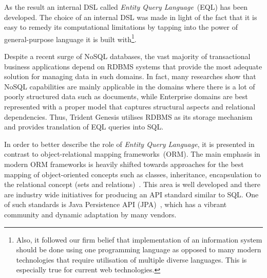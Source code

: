   As the result an internal DSL called \emph{Entity Query Language}~(EQL) has been developed.
  The choice of an internal DSL was made in light of the fact that it is easy to remedy its computational limitations by tapping into the power of general-purpose language it is built with\footnote{
  Also, it followed our firm belief that implementation of an information system should be done using one programming language as opposed to many modern technologies that require utilisation of multiple diverse languages.
  This is especially true for current web technologies.}.

  Despite a recent surge of NoSQL databases, the vast majority of transactional business applications depend on RDBMS systems that provide the most adequate solution for managing data in such domains.
  In fact, many researches show that NoSQL capabilities are mainly applicable in the domains where there is a lot of poorly structured data such as documents, while Enterprise domains are best represented with a proper model that captures structural aspects and relational dependencies.
  Thus, Trident Genesis utilises RDBMS as its storage mechanism and provides translation of EQL queries into SQL.

  In order to better describe the role of \emph{Entity Query Language}, it is presented in contrast to object-relational mapping frameworks~(ORM).
  The main emphasis in modern ORM frameworks is heavily shifted towards approaches for the best mapping of object-oriented concepts such as classes, inheritance, encapsulation to the relational concept (sets and relations)~\cite{Barnes:2007:ORM, HBBPB:2008}.
  This area is well developed and there are industry wide initiatives for producing an API standard similar to SQL.
  One of such standards is Java Persistence API (JPA)~\cite{DeMichiel:2012:JPA}, which has a vibrant community and dynamic adaptation by many vendors.
  
